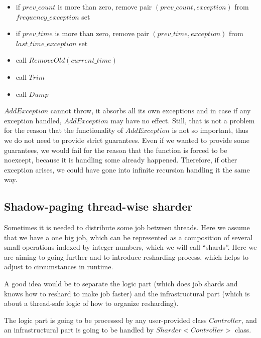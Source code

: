 \documentclass{article}
\begin{document}
\begin{itemize}
	\item if $prev\_count$ is more than zero, remove pair $(prev\_count, exception)$ from \\
		$frequency\_exception$ set
	\item if $prev\_time$ is more than zero, remove pair $(prev\_time, exception)$ from \\
		$last\_time\_exception$ set
	\item call $RemoveOld(current\_time)$
	\item call $Trim$
	\item call $Dump$
\end{itemize}

$AddException$ cannot throw, it absorbs all its own exceptions and in case if any exception handled, $AddException$ may have no effect. Still, that is not a problem for the reason that the functionality of $AddException$ is not so important, thus we do not need to provide strict guarantees. Even if we wanted to provide some guarantees, we would fail for the reason that the function is forced to be noexcept, because it is handling some already happened. Therefore, if other exception arises, we could have gone into infinite recursion handling it the same way.


\subsection{Shadow-paging thread-wise sharder}
\label{subsec:shadow_page_thread_wise_sharder}

Sometimes it is needed to distribute some job between threads. Here we assume that we have a one big job, which can be represented as a composition of several small operations indexed by integer numbers, which we will call ``shards''. Here we are aiming to going further and to introduce resharding process, which helps to adjust to circumstances in runtime.

A good idea would be to separate the logic part (which does job shards and knows how to reshard to make job faster) and the infrastructural part (which is about a thread-safe logic of how to organize resharding).

The logic part is going to be processed by any user-provided class $Controller$, and an infrastructural part is going to be handled by $Sharder<Controller>$ class.
\end{document}
